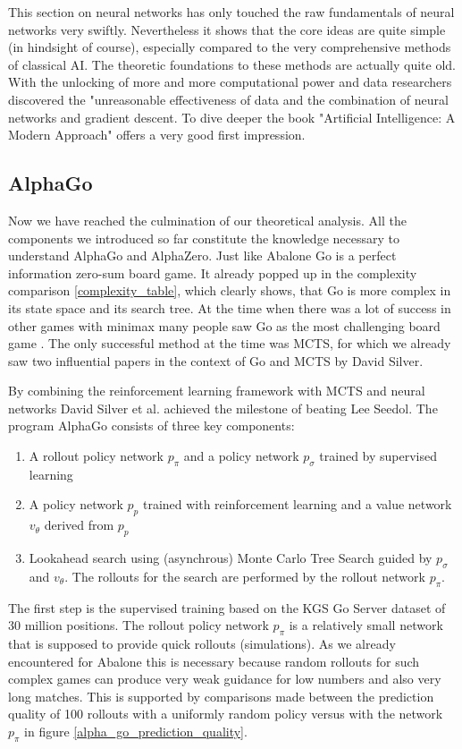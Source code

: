 This section on neural networks has only touched the raw fundamentals of neural networks very swiftly. Nevertheless it shows that the core ideas are quite simple (in hindsight of course), especially compared to the very comprehensive methods of classical AI. The theoretic foundations to these methods are actually quite old. With the unlocking of more and more computational power and data researchers discovered the "unreasonable effectiveness of data \cite{halevy_unreasonable_2009} and the combination of neural networks and gradient descent. To dive deeper the book "Artificial Intelligence: A Modern Approach" \cite{russell_artificial_2021} offers a very good first impression.

\subsection{AlphaGo}
Now we have reached the culmination of our theoretical analysis. All the components we introduced so far constitute the knowledge necessary to understand AlphaGo and AlphaZero. Just like Abalone Go is a perfect information zero-sum board game. It already popped up in the complexity comparison \ref{complexity_table}, which clearly shows, that Go is more complex in its state space and its search tree. At the time when there was a lot of success in other games with minimax many people saw Go as the most challenging board game \cite{muller_computer_2002}. The only successful method at the time was MCTS, for which we already saw two influential papers in the context of Go and MCTS by David Silver.

By combining the reinforcement learning framework with MCTS and neural networks David Silver et al. achieved the milestone of beating Lee Seedol. The program AlphaGo consists of three key components:

\begin{enumerate}
    \item A rollout policy network $p_{\pi}$ and a policy network $p_{\sigma}$ trained by supervised learning
    \item A policy network $p_p$ trained with reinforcement learning and a value network $v_{\theta}$ derived from $p_p$
    \item Lookahead search using (asynchrous) Monte Carlo Tree Search guided by $p_{\sigma}$ and $v_{\theta}$. The rollouts for the search are performed by the rollout network $p_{\pi}$.
\end{enumerate}

The first step is the supervised training based on the KGS Go Server dataset of 30 million positions. The rollout policy network $p_{\pi}$ is a relatively small network that is supposed to provide quick rollouts (simulations). As we already encountered for Abalone this is necessary because random rollouts for such complex games can produce very weak guidance for low numbers and also very long matches. This is supported by comparisons made between the prediction quality of 100 rollouts with a uniformly random policy versus with the network $p_{\pi}$ in figure \ref{alpha_go_prediction_quality}.

